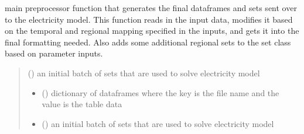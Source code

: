 \documentclass[letterpaper,10pt,english]{sphinxmanual}
\begin{document}
\begin{fulllineitems}
\label{\detokenize{src.models.electricity.scripts.preprocessor:src.models.electricity.scripts.preprocessor.preprocessor}}
\pysigstartsignatures
\pysiglinewithargsret
{}
{}
{}
\pysigstopsignatures
\sphinxAtStartPar
main preprocessor function that generates the final dataframes and sets sent over to the
electricity model. This function reads in the input data, modifies it based on the temporal
and regional mapping specified in the inputs, and gets it into the final formatting needed.
Also adds some additional regional sets to the set class based on parameter inputs.
\begin{quote}\begin{description}
\sphinxAtStartPar
{} ({\hyperref[\detokenize{src.models.electricity.scripts.preprocessor:src.models.electricity.scripts.preprocessor.Sets}]{}}) \textendash{} an initial batch of sets that are used to solve electricity model

\sphinxAtStartPar
\begin{itemize}
\item {} 
\sphinxAtStartPar
{} () \textendash{} dictionary of dataframes where the key is the file name and the value is the table data

\item {} 
\sphinxAtStartPar
{} () \textendash{} an initial batch of sets that are used to solve electricity model

\end{itemize}


\end{description}\end{quote}

\end{fulllineitems}

\end{document}
